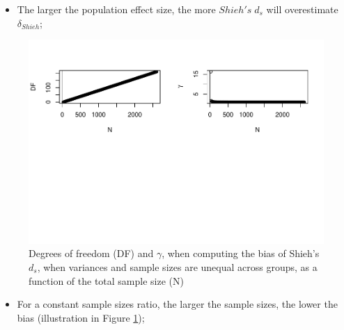 \documentclass[
  man]{apa6}
\providecommand{\tightlist}{%
  \setlength{\itemsep}{0pt}\setlength{\parskip}{0pt}}
\begin{document}
\begin{itemize}
\tightlist
\item
  The larger the population effect size, the more \(Shieh's \; d_s\) will overestimate \(\delta_{Shieh}\);
\end{itemize}

\begin{figure}
\centering
\includegraphics{Theoretical-Bias-of-all-estimators-as-a-function-of-population-parameters_files/figure-latex/biasshiehhetunbalNsize2-1.pdf}
\caption{\label{fig:biasshiehhetunbalNsize2}Degrees of freedom (DF) and \(\gamma\), when computing the bias of Shieh's \(d_s\), when variances and sample sizes are unequal across groups, as a function of the total sample size (N)}
\end{figure}

\begin{itemize}
\tightlist
\item
  For a constant sample sizes ratio, the larger the sample sizes, the lower the bias (illustration in Figure \ref{fig:biasshiehhetunbalNsize2});
\end{itemize}
\end{document}

